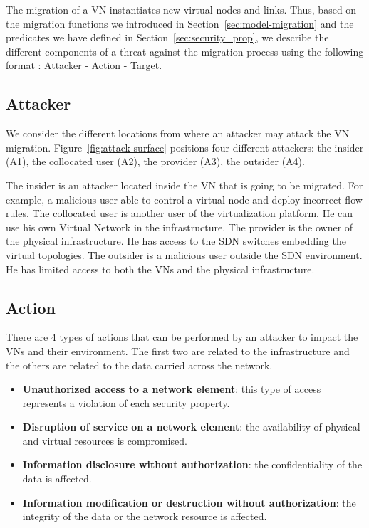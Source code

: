 \label{sec:attacker-model}
The migration of a VN instantiates new virtual nodes and links.
Thus, based on the migration functions we introduced in Section~\ref{sec:model-migration} and the predicates we have defined in Section~\ref{sec:security_prop}, we describe the different components of a threat against the migration process using the following format
: Attacker - Action - Target.



\subsection{Attacker}
We consider the different locations from where an attacker may attack the VN migration. 
Figure~\ref{fig:attack-surface} positions four different attackers: the insider (A1), the collocated user (A2), the provider (A3), the outsider (A4).

The insider is an attacker located inside the VN that is going to be migrated.
For example, a malicious user able to control a virtual node and deploy incorrect flow rules.
The collocated user is another user of the virtualization platform.
He can use his own Virtual Network in the infrastructure.
The provider is the owner of the physical infrastructure.
He has access to the SDN switches embedding the virtual topologies.
The outsider is a malicious user outside the SDN environment.
He has limited access to both the VNs and the physical infrastructure.

\subsection{Action}
There are 4 types of actions that can be performed by an attacker to impact the VNs and their environment.
The first two are related to the infrastructure and the others are related to the data carried across the network.
\begin{itemize}
\item \textbf{Unauthorized access to a network element}:
this type of access represents a violation of each security property.
\item \textbf{Disruption of service on a network element}:
the availability of physical and virtual resources is compromised.
\item \textbf{Information disclosure without authorization}:
the confidentiality of the data is affected.
\item \textbf{Information modification or destruction without authorization}:
the integrity of the data or the network resource is affected.
\end{itemize}

